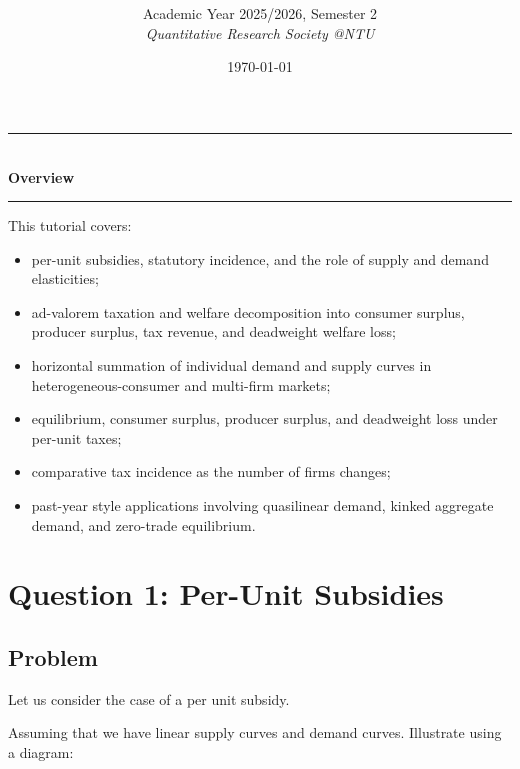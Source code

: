 \documentclass[12pt]{article}
\title{
\CourseCode \CourseName \\[0.3em]
\large \DocType
}
\author{
  Academic Year 2025/2026, Semester 2 \\[0.25em]
  \textit{Quantitative Research Society @NTU}
}
\date{\today}
\begin{document}
\maketitle
\thispagestyle{plainfirst}
\pagestyle{main}
\bigskip

\begin{center}
  \rule{0.8\textwidth}{0.4pt}\\[4pt]
  \textbf{Overview}\\[2pt]
  \rule{0.8\textwidth}{0.4pt}
\end{center}

\noindent
This tutorial covers:
\begin{itemize}[leftmargin=*]
  \item per-unit subsidies, statutory incidence, and the role of supply and demand elasticities;
  \item ad-valorem taxation and welfare decomposition into consumer surplus, producer surplus, tax revenue, and deadweight welfare loss;
  \item horizontal summation of individual demand and supply curves in heterogeneous-consumer and multi-firm markets;
  \item equilibrium, consumer surplus, producer surplus, and deadweight loss under per-unit taxes;
  \item comparative tax incidence as the number of firms changes;
  \item past-year style applications involving quasilinear demand, kinked aggregate demand, and zero-trade equilibrium.
\end{itemize}

\bigskip

\newpage
\tableofcontents

\newpage
\section{Question 1: Per-Unit Subsidies}

\subsection{Problem}
\noindent
Let us consider the case of a per unit subsidy.

Assuming that we have linear supply curves and demand curves. Illustrate using a diagram:
\end{document}
